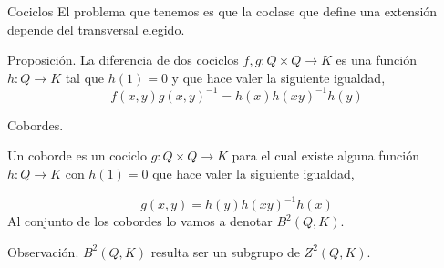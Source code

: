 \documentclass[aspectratio=169, 9pt]{beamer}
\begin{document}
\begin{frame}[fragile]{Cociclos}
El problema que tenemos es que la coclase que define una extensión depende del transversal elegido. 

\pause
\bigskip

\begin{alertblock}{Proposición.}
	La diferencia de dos cociclos $f,g:Q \times Q \to K$ es una función $h:Q \to K$ tal que $h(1)=0$ y que hace valer la siguiente igualdad,
	\begin{equation*}
	f(x,y) g(x,y)^{-1} = h(x)h(xy)^{-1}h(y)
	\end{equation*}
\end{alertblock}



\end{frame}

\begin{frame}[fragile]{Cobordes.}

 Un \alert{coborde} es un cociclo $g:Q \times Q \to K$ para el cual existe alguna función $h:Q \to K$ con $h(1)=0$ que hace valer la siguiente igualdad,
 
 \begin{equation*}
     g(x,y) = h(y)h(xy)^{-1}h(x)
 \end{equation*}
 Al conjunto de los cobordes lo vamos a denotar $B^2(Q,K)$.
 
 \pause
 \medskip
 \begin{exampleblock}{Observación.}
 $B^2(Q,K)$ resulta ser un subgrupo de $Z^2(Q,K)$.
\end{exampleblock}
 
\end{frame}
\end{document}
